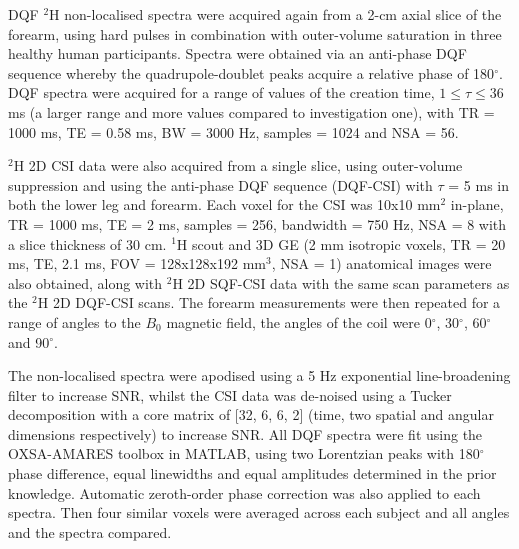 \ac{DQF} $^2$H non-localised spectra were acquired again from a 2-cm axial slice of the forearm, using hard pulses in combination with outer-volume saturation in three healthy human participants. Spectra were obtained via an anti-phase \ac{DQF} sequence \cite{Sharf1995DetectionNMR-Spectroscopy} whereby the quadrupole-doublet peaks acquire a relative phase of 180$^\circ$. \ac{DQF} spectra were acquired for a range of values of the creation time, $1\leq\tau\leq36$ ms (a larger range and more values compared to investigation one), with \ac{TR} = 1000 ms, \ac{TE} = 0.58 ms, \ac{BW} = 3000 Hz, samples = 1024 and NSA = 56.

$^2$H 2D \ac{CSI} data were also acquired from a single slice, using outer-volume suppression and using the anti-phase \ac{DQF} sequence (\ac{DQF}-\ac{CSI}) with $\tau$ = 5 ms in both the lower leg and forearm. Each voxel for the \ac{CSI} was 10x10 mm$^2$ in-plane, \ac{TR} = 1000 ms, \ac{TE} = 2 ms, samples = 256, bandwidth = 750 Hz, NSA = 8 with a slice thickness of 30 cm. $^1$H scout and 3D \ac{GE} (2 mm isotropic voxels, \ac{TR} = 20 ms, \ac{TE}, 2.1 ms, \ac{FOV} = 128x128x192 mm$^3$, NSA = 1) anatomical images were also obtained, along with $^2$H 2D \ac{SQF}-\ac{CSI} data with the same scan parameters as the $^2$H 2D \ac{DQF}-\ac{CSI} scans. The forearm measurements were then repeated for a range of angles to the $B_0$ magnetic field, the angles of the coil were 0$^\circ$, 30$^\circ$, 60$^\circ$ and 90$^\circ$. 

The non-localised spectra were apodised using a 5 Hz exponential line-broadening filter to increase \ac{SNR}, whilst the \ac{CSI} data was de-noised using a Tucker decomposition \cite{Bader2007EfficientTensors} with a core matrix of [32, 6, 6, 2] (time, two spatial and angular dimensions respectively) to increase \ac{SNR}. All \ac{DQF} spectra were fit using the OXSA-AMARES \cite{Purvis2017OXSA:MATLAB} toolbox in MATLAB, using two Lorentzian peaks with 180$^\circ$ phase difference, equal linewidths and equal amplitudes determined in the prior knowledge. Automatic zeroth-order phase correction was also applied to each spectra. Then four similar voxels were averaged across each subject and all angles and the spectra compared.

